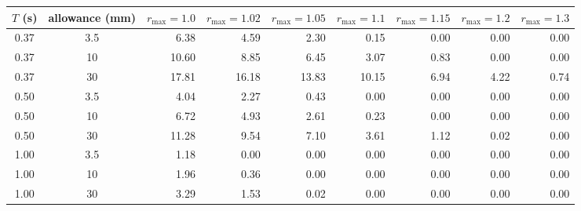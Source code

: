 \begin{tabular}{@{}ccrrrrrrr@{}}\toprule
$T$ (s) & allowance (mm) & $r_{\max}=1.0$ & $r_{\max}=1.02$ & $r_{\max}=1.05$ & $r_{\max}=1.1$ & $r_{\max}=1.15$ & $r_{\max}=1.2$ & $r_{\max}=1.3$\\\midrule
0.37 & 3.5 & 6.38 & 4.59 & 2.30 & 0.15 & 0.00 & 0.00 & 0.00\\
0.37 & 10 & 10.60 & 8.85 & 6.45 & 3.07 & 0.83 & 0.00 & 0.00\\
0.37 & 30 & 17.81 & 16.18 & 13.83 & 10.15 & 6.94 & 4.22 & 0.74\\
0.50 & 3.5 & 4.04 & 2.27 & 0.43 & 0.00 & 0.00 & 0.00 & 0.00\\
0.50 & 10 & 6.72 & 4.93 & 2.61 & 0.23 & 0.00 & 0.00 & 0.00\\
0.50 & 30 & 11.28 & 9.54 & 7.10 & 3.61 & 1.12 & 0.02 & 0.00\\
1.00 & 3.5 & 1.18 & 0.00 & 0.00 & 0.00 & 0.00 & 0.00 & 0.00\\
1.00 & 10 & 1.96 & 0.36 & 0.00 & 0.00 & 0.00 & 0.00 & 0.00\\
1.00 & 30 & 3.29 & 1.53 & 0.02 & 0.00 & 0.00 & 0.00 & 0.00\\
\bottomrule\end{tabular}